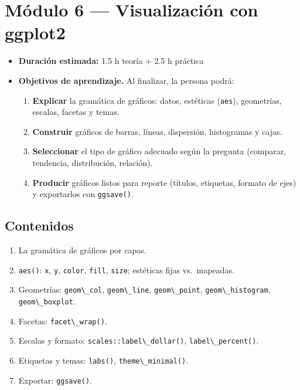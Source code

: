 \chapter{Módulo 6 --- Visualización con ggplot2}

\begin{itemize}
\tightlist
\item
  \textbf{Duración estimada:} 1.5 h teoría + 2.5 h práctica
\item
  \textbf{Objetivos de aprendizaje.} Al finalizar, la persona podrá:

  \begin{enumerate}
  \def\labelenumi{\arabic{enumi}.}
  \tightlist
  \item
    \textbf{Explicar} la gramática de gráficos: datos, estéticas
    (\passthrough{\lstinline!aes!}), geometrías, escalas, facetas y
    temas.
  \item
    \textbf{Construir} gráficos de barras, líneas, dispersión,
    histogramas y cajas.
  \item
    \textbf{Seleccionar} el tipo de gráfico adecuado según la pregunta
    (comparar, tendencia, distribución, relación).
  \item
    \textbf{Producir} gráficos listos para reporte (títulos, etiquetas,
    formato de ejes) y exportarlos con
    \passthrough{\lstinline!ggsave()!}.
  \end{enumerate}
\end{itemize}

\section{Contenidos}

\begin{enumerate}
\def\labelenumi{\arabic{enumi}.}
\tightlist
\item
  La gramática de gráficos por capas.
\item
  \passthrough{\lstinline!aes()!}: \passthrough{\lstinline!x!},
  \passthrough{\lstinline!y!}, \passthrough{\lstinline!color!},
  \passthrough{\lstinline!fill!}, \passthrough{\lstinline!size!};
  estéticas fijas vs.~mapeadas.
\item
  Geometrías: \passthrough{\lstinline!geom\_col!},
  \passthrough{\lstinline!geom\_line!},
  \passthrough{\lstinline!geom\_point!},
  \passthrough{\lstinline!geom\_histogram!},
  \passthrough{\lstinline!geom\_boxplot!}.
\item
  Facetas: \passthrough{\lstinline!facet\_wrap()!}.
\item
  Escalas y formato: \passthrough{\lstinline!scales::label\_dollar()!},
  \passthrough{\lstinline!label\_percent()!}.
\item
  Etiquetas y temas: \passthrough{\lstinline!labs()!},
  \passthrough{\lstinline!theme\_minimal()!}.
\item
  Exportar: \passthrough{\lstinline!ggsave()!}.
\end{enumerate}

